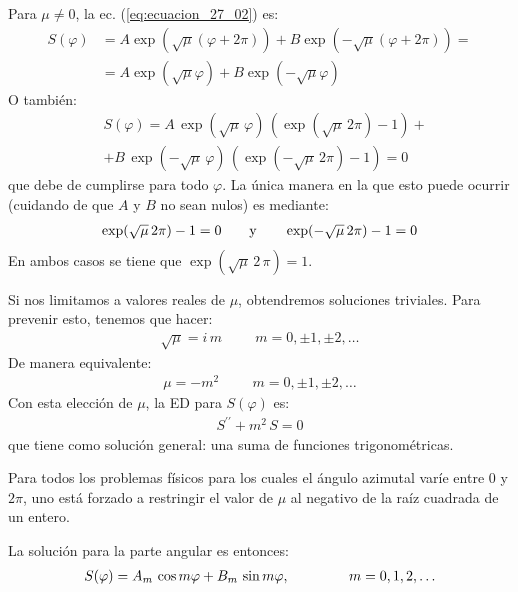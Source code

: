 \documentclass[12pt]{article}
\newcommand{\sderivada}[1]{\ensuremath{{#1}^{\prime \prime}}}
\numberwithin{equation}{section}
\begin{document}
\par
Para $\mu \neq 0$, la ec. (\ref{eq:ecuacion_27_02}) es:
\begin{align*}
S (\varphi) &= A \exp(\sqrt{\mu}(\varphi {+} 2 \pi)) {+} B \exp(- \sqrt{\mu}(\varphi {+} 2 \pi)) = \\[0.5em] 
&= A \exp(\sqrt{\mu} \varphi) + B \exp(-\sqrt{\mu} \varphi)
\end{align*}
O también:
\begin{align*}
&S (\varphi) = A \, \exp(\sqrt{\mu} \, \varphi) \, (\exp(\sqrt{\mu} \, 2 \pi) - 1) + \\[0.5em]
&+ B \, \exp(- \sqrt{\mu} \, \varphi) \, (\exp(- \sqrt{\mu} \, 2 \pi) - 1) = 0
\end{align*}
que debe de cumplirse para todo $\varphi$. La única manera en la que esto puede ocurrir (cuidando de que $A$ y $B$ no sean nulos) es mediante:
\begin{align*}
\exp(\sqrt{\mu} \, 2 \pi) - 1 = 0 \hspace{0.7cm} \mbox{y} \hspace{0.7cm} \exp(- \sqrt{\mu} \, 2 \pi) - 1 = 0
\end{align*}
En ambos casos se tiene que $\exp(\sqrt{\mu} \, 2 \, \pi) = 1$.
\par
Si nos limitamos a valores reales de $\mu$, obtendremos soluciones triviales. Para prevenir esto, tenemos que hacer:
\begin{align*}
\sqrt{\mu} = i \, m \hspace{1cm} m = 0, \pm 1, \pm 2, \ldots
\end{align*}
De manera equivalente:
\begin{align*}
\mu = -m^{2}  \hspace{1cm} m = 0, \pm 1, \pm 2, \ldots
\end{align*}
Con esta elección de $\mu$, la ED para $S (\varphi)$ es:
\begin{align*}
\sderivada{S} + m^{2} \, S = 0
\end{align*}
que tiene como solución general: una suma de funciones trigonométricas.
\par
Para todos los problemas físicos para los cuales el ángulo azimutal varíe entre $0$ y $2 \pi$, uno está forzado a restringir el valor de $\mu$ al negativo de la raíz cuadrada de un entero.
\par
La solución para la parte angular es entonces:
\begin{align}
S (\varphi) = A_{m} \, \cos m \varphi + B_{m} \, \sin m \varphi, \hspace{1.5cm} m = 0, 1, 2, \ldots
\label{eq:ecuacion_27_03}
\end{align}
\end{document}
